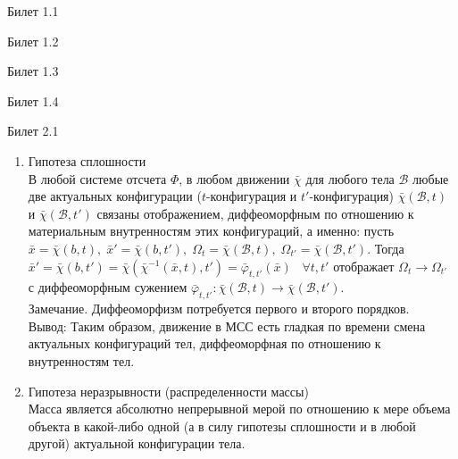 \documentclass[a4paper,12pt]{article}
\begin{document}
\newpage
\begin{mybox}{\hypertarget{bil1_1}{Билет 1.1}}
\end{mybox}
\newpage
\begin{mybox}{\hypertarget{bil1_2}{Билет 1.2}}
\end{mybox}
\newpage
\begin{mybox}{\hypertarget{bil1_3}{Билет 1.3}}
\end{mybox}
\newpage
\begin{mybox}{\hypertarget{bil1_4}{Билет 1.4}}
\end{mybox}

\newpage
\begin{mybox}{\hypertarget{bil2_1}{Билет 2.1}}
\begin{enumerate}
    \item Гипотеза сплошности\\
    В любой системе отсчета $\Phi$, в любом движении $\bar{\chi}$ для любого тела $\mathscr{B}$ любые две актуальных конфигурации ($t$-конфигурация и $t'$-конфигурация) $\bar{\chi}(\mathscr{B}, t)$ и  $\bar{\chi}(\mathscr{B}, t')$ связаны отображением, диффеоморфным по отношению к материальным внутренностям этих конфигураций, а именно: пусть $\bar{x} = \bar{\chi}(b, t),\;\bar{x}' = \bar{\chi}(b, t'), \;\Omega_t = \bar{\chi}(\mathscr{B}, t), \;\Omega_{t'} = \bar{\chi}(\mathscr{B}, t') $. Тогда $\bar{x}' = \bar{\chi}(b, t') = \bar{\chi}(\bar{\chi}^{-1}(\bar{x}, t), t') = \bar{\varphi}_{t,t'}(\bar{x})\;\;\;\forall t, t'$ отображает $\Omega_t \to \Omega_{t'}$ с диффеоморфным сужением $\bar{\varphi}_{t,t'}: \bar{\chi}(\mathscr{B}, t) \to \bar{\chi}(\mathscr{B}, t')$.\\
    Замечание. Диффеоморфизм потребуется первого и второго порядков.\\
    Вывод: Таким образом, движение в МСС есть гладкая по времени смена актуальных конфигураций тел, диффеоморфная по отношению к внутренностям тел.
    \item Гипотеза неразрывности (распределенности массы)\\
    Масса является абсолютно непрерывной мерой по отношению к мере объема объекта в какой-либо одной (а в силу гипотезы сплошности и в любой другой) актуальной конфигурации тела.\\

\end{enumerate}
\end{mybox}
\end{document}
